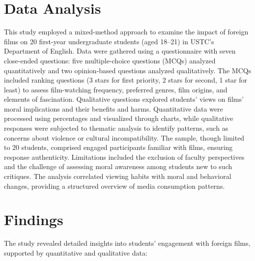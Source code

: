 \documentclass[12pt]{article}
\begin{document}
\section{Data Analysis}
This study employed a mixed-method approach to examine the impact of foreign films on 20 first-year undergraduate students (aged 18–21) in USTC’s Department of English. Data were gathered using a questionnaire with seven close-ended questions: five multiple-choice questions (MCQs) analyzed quantitatively and two opinion-based questions analyzed qualitatively. The MCQs included ranking questions (3 stars for first priority, 2 stars for second, 1 star for least) to assess film-watching frequency, preferred genres, film origins, and elements of fascination. Qualitative questions explored students’ views on films’ moral implications and their benefits and harms. Quantitative data were processed using percentages and visualized through charts, while qualitative responses were subjected to thematic analysis to identify patterns, such as concerns about violence or cultural incompatibility. The sample, though limited to 20 students, comprised engaged participants familiar with films, ensuring response authenticity. Limitations included the exclusion of faculty perspectives and the challenge of assessing moral awareness among students new to such critiques. The analysis correlated viewing habits with moral and behavioral changes, providing a structured overview of media consumption patterns.

\section{Findings}
The study revealed detailed insights into students’ engagement with foreign films, supported by quantitative and qualitative data:
\end{document}

